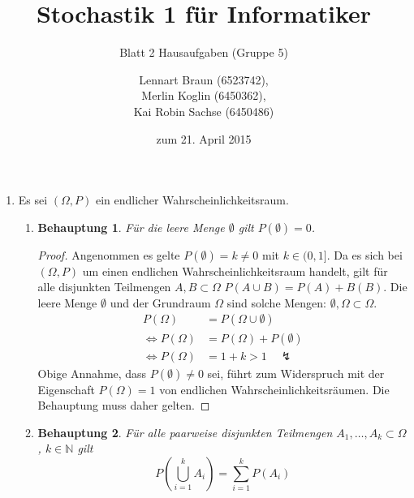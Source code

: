 \documentclass[a4paper]{scrartcl}
\title{Stochastik 1 für Informatiker}
\subtitle{Blatt 2 Hausaufgaben (Gruppe 5)}
\author{
    Lennart Braun (6523742), \\
    Merlin Koglin (6450362), \\
    Kai Robin Sachse (6450486)
}
\date{zum 21. April 2015}
\newtheorem*{behaupt}{Behauptung}
\newcommand{\gdw}{\Leftrightarrow}
\begin{document}
\maketitle

\begin{enumerate}[label=\bfseries\arabic*.]
    \item Es sei $(\Omega, P)$ ein endlicher Wahrscheinlichkeitsraum.
        \begin{enumerate}[label=(\roman*)]
            \item
                \begin{behaupt}
                    Für die leere Menge $\emptyset$ gilt $P(\emptyset) = 0$.
                \end{behaupt}
                \begin{proof}
                    Angenommen es gelte $P(\emptyset) = k \neq 0$ mit
                    $k \in (0, 1]$.
                    Da es sich bei $(\Omega, P)$ um einen endlichen
                    Wahrscheinlichkeitsraum handelt, gilt für alle disjunkten
                    Teilmengen $A, B \subset \Omega$
                    $P(A \cup B) = P(A) + B(B)$.
                    Die leere Menge $\emptyset$ und der Grundraum $\Omega$ sind
                    solche Mengen: $\emptyset, \Omega \subset \Omega$.
                    \begin{equation}
                        \begin{split}
                            P(\Omega) &= P(\Omega \cup \emptyset) \\
                            \gdw P(\Omega) &= P(\Omega) + P(\emptyset) \\
                            \gdw P(\Omega) &= 1 + k > 1 \quad \lightning
                        \end{split}
                    \end{equation}
                    Obige Annahme, dass $P(\emptyset) \neq 0$ sei, führt zum
                    Widerspruch mit der Eigenschaft $P(\Omega) = 1$ von
                    endlichen Wahrscheinlichkeitsräumen.
                    Die Behauptung muss daher gelten.
                \end{proof}
                

            \item
                \begin{behaupt}
                    Für alle paarweise disjunkten Teilmengen
                    $A_1, \ldots, A_k \subset \Omega$, $k \in \mathbb{N}$ gilt
                    \begin{equation*}
                        P \left( \bigcup_{i=1}^k A_i \right)
                        = \sum_{i=1}^k P(A_i)
                    \end{equation*}
                    

\end{behaupt}
\end{enumerate}
\end{enumerate}
\end{document}
